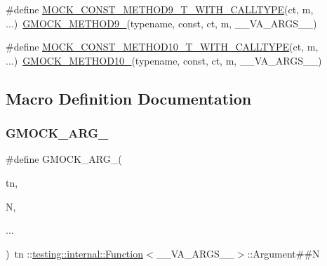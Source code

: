 \begin{DoxyCompactItemize}
\item 
\#define \hyperlink{gmock-generated-function-mockers_8h_afb8878388e0875e109d1fd6902471780}{M\+O\+C\+K\+\_\+\+C\+O\+N\+S\+T\+\_\+\+M\+E\+T\+H\+O\+D9\+\_\+\+T\+\_\+\+W\+I\+T\+H\+\_\+\+C\+A\+L\+L\+T\+Y\+PE}(ct,  m, ...)~\hyperlink{gmock-generated-function-mockers_8h_aa820171a19cc587c247dbe05cbffc55f}{G\+M\+O\+C\+K\+\_\+\+M\+E\+T\+H\+O\+D9\+\_\+}(typename, const, ct, m, \+\_\+\+\_\+\+V\+A\+\_\+\+A\+R\+G\+S\+\_\+\+\_\+)
\item 
\#define \hyperlink{gmock-generated-function-mockers_8h_af697bae09aedcdfb3d6897081efe7541}{M\+O\+C\+K\+\_\+\+C\+O\+N\+S\+T\+\_\+\+M\+E\+T\+H\+O\+D10\+\_\+\+T\+\_\+\+W\+I\+T\+H\+\_\+\+C\+A\+L\+L\+T\+Y\+PE}(ct,  m, ...)~\hyperlink{gmock-generated-function-mockers_8h_a81a48223a8771de36ef92ac6d56f6e81}{G\+M\+O\+C\+K\+\_\+\+M\+E\+T\+H\+O\+D10\+\_\+}(typename, const, ct, m, \+\_\+\+\_\+\+V\+A\+\_\+\+A\+R\+G\+S\+\_\+\+\_\+)
\end{DoxyCompactItemize}


\subsection{Macro Definition Documentation}
\mbox{\label{gmock-generated-function-mockers_8h_a887575cc1c31158fba808180a10c004f}} 
\subsubsection{\texorpdfstring{G\+M\+O\+C\+K\+\_\+\+A\+R\+G\+\_\+}{GMOCK\_ARG\_}}
{\footnotesize\ttfamily \#define G\+M\+O\+C\+K\+\_\+\+A\+R\+G\+\_\+(\begin{DoxyParamCaption}\item[{}]{tn,  }\item[{}]{N,  }\item[{}]{... }\end{DoxyParamCaption})~tn \+::\hyperlink{structtesting_1_1internal_1_1_function}{testing\+::internal\+::\+Function}$<$\+\_\+\+\_\+\+V\+A\+\_\+\+A\+R\+G\+S\+\_\+\+\_\+$>$\+::Argument\#\#N}

\mbox{\label{gmock-generated-function-mockers_8h_aa87d0009fe91f1c89d658776b55a769c}} 
